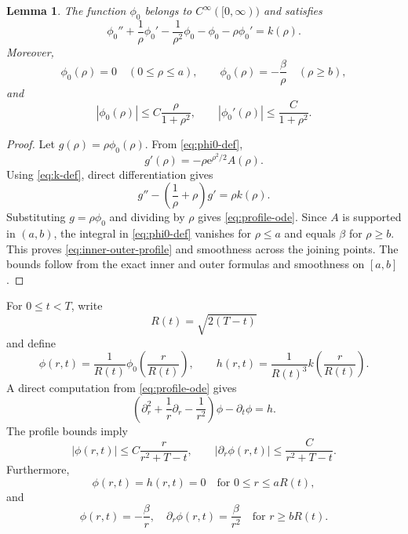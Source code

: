 \documentclass[10pt]{amsart}
\newtheorem{lemma}[theorem]{Lemma}
\theoremstyle{definition}
\newcommand{\e}{\mathrm e}
\begin{document}
\begin{lemma}
\label{lem:profile}
The function $\phi_0$ belongs to $C^\infty([0,\infty))$ and satisfies
\begin{equation}
\label{eq:profile-ode}
    \phi_0''+\frac1\rho\phi_0'-\frac1{\rho^2}\phi_0
    -\phi_0-\rho\phi_0'=k(\rho).
\end{equation}
Moreover,
\begin{equation}
\label{eq:inner-outer-profile}
    \phi_0(\rho)=0\quad(0\leq\rho\leq a),
    \qquad
    \phi_0(\rho)=-\frac\beta\rho\quad(\rho\geq b),
\end{equation}
and
\begin{equation}
\label{eq:profile-bounds}
    |\phi_0(\rho)|\leq C\frac{\rho}{1+\rho^2},
    \qquad
    |\phi_0'(\rho)|\leq\frac{C}{1+\rho^2}.
\end{equation}
\end{lemma}

\begin{proof}
Let $g(\rho)=\rho\phi_0(\rho)$.  From \eqref{eq:phi0-def},
\[
    g'(\rho)=-\rho\e^{\rho^2/2}A(\rho).
\]
Using \eqref{eq:k-def}, direct differentiation gives
\[
    g''-\left(\frac1\rho+\rho\right)g'=\rho k(\rho).
\]
Substituting $g=\rho\phi_0$ and dividing by $\rho$ gives
\eqref{eq:profile-ode}.  Since $A$ is supported in $(a,b)$, the integral in
\eqref{eq:phi0-def} vanishes for $\rho\leq a$ and equals $\beta$ for
$\rho\geq b$.  This proves \eqref{eq:inner-outer-profile} and smoothness across
the joining points.  The bounds follow from the exact inner and outer formulas and
smoothness on $[a,b]$.
\end{proof}

For $0\leq t<T$, write
\[
    R(t)=\sqrt{2(T-t)}
\]
and define
\begin{equation}
\label{eq:phi-h-def}
    \phi(r,t)=\frac1{R(t)}\phi_0\left(\frac r{R(t)}\right),
    \qquad
    h(r,t)=\frac1{R(t)^3}k\left(\frac r{R(t)}\right).
\end{equation}
A direct computation from \eqref{eq:profile-ode} gives
\begin{equation}
\label{eq:phi-equation}
    \left(\partial_r^2+\frac1r\partial_r-\frac1{r^2}\right)\phi
    -\partial_t\phi=h.
\end{equation}
The profile bounds imply
\begin{equation}
\label{eq:phi-pointwise}
    |\phi(r,t)|\leq C\frac r{r^2+T-t},
    \qquad
    |\partial_r\phi(r,t)|\leq\frac C{r^2+T-t}.
\end{equation}
Furthermore,
\begin{equation}
\label{eq:inner-zero}
    \phi(r,t)=h(r,t)=0
    \quad\text{for }0\leq r\leq aR(t),
\end{equation}
and
\begin{equation}
\label{eq:outer-phi}
    \phi(r,t)=-\frac\beta r,
    \quad
    \partial_r\phi(r,t)=\frac\beta{r^2}
    \quad\text{for }r\geq bR(t).
\end{equation}
\end{document}

